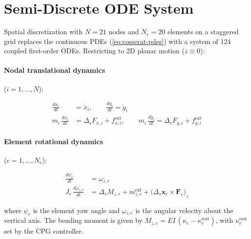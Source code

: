 \documentclass[11pt]{article}
\newcommand{\vect}[1]{\mathbf{#1}}
\newcommand{\dd}[2]{\frac{d #1}{d #2}}
\begin{document}
\section{Semi-Discrete ODE System}
\label{sec:ode}

Spatial discretization with $N = 21$ nodes and $N_e = 20$ elements on a staggered grid replaces the continuous PDEs (\ref{eq:cosserat-pdes}) with a system of 124 coupled first-order ODEs.
Restricting to 2D planar motion ($z \equiv 0$):

\paragraph{Nodal translational dynamics} ($i = 1, \ldots, N$):

\begin{subequations}
\label{eq:node-ode}
\begin{align}
  \dd{x_i}{t} &= \dot{x}_i, \qquad
  \dd{y_i}{t} = \dot{y}_i
  \label{eq:node-pos} \\[4pt]
  m_i\,\dd{\dot{x}_i}{t} &= \Delta_s F_{x,i} + f_{x,i}^{\text{ext}}, \qquad
  m_i\,\dd{\dot{y}_i}{t} = \Delta_s F_{y,i} + f_{y,i}^{\text{ext}}
  \label{eq:node-vel}
\end{align}
\end{subequations}

\paragraph{Element rotational dynamics} ($e = 1, \ldots, N_e$):

\begin{subequations}
\label{eq:element-ode}
\begin{align}
  \dd{\psi_e}{t} &= \omega_{z,e}
  \label{eq:elem-yaw} \\[4pt]
  J_e\,\dd{\omega_{z,e}}{t} &= \Delta_s M_{z,e} + m_{z,e}^{\text{ext}}
    + \bigl(\Delta_s \vect{x}_e \times \vect{F}_e\bigr)_z
  \label{eq:elem-omega}
\end{align}
\end{subequations}

\noindent
where $\psi_e$ is the element yaw angle and $\omega_{z,e}$ is the angular velocity about the vertical axis.
The bending moment is given by $M_{z,e} = EI\,(\kappa_e - \kappa_e^{\text{rest}})$, with $\kappa_e^{\text{rest}}$ set by the CPG controller.
\end{document}
